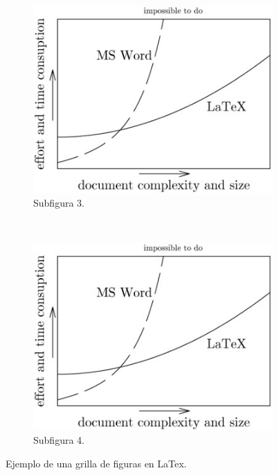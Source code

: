\begin{figure}[H]
\begin{subfigure}[b]{0.225\textwidth}
    \end{subfigure}
    \begin{subfigure}[b]{0.225\textwidth}
            \includegraphics[width=\textwidth]{../book/capitulo-ej/graphics/ejemplo-1.jpg}
            \caption{Subfigura 3.}
    \end{subfigure}
    ~~~~
    \begin{subfigure}[b]{0.225\textwidth}
            \includegraphics[width=\textwidth]{../book/capitulo-ej/graphics/ejemplo-1.jpg}
            \caption{Subfigura 4.}

    \end{subfigure}
    \caption{\label{fig:ejemplo-fig-grilla}Ejemplo de una grilla de figuras en LaTex.}

\end{figure}


